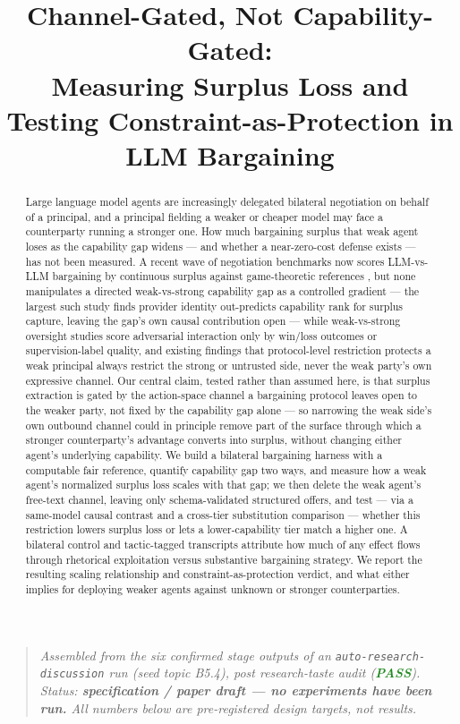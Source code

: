 \documentclass[11pt]{article}
\title{\textbf{Channel-Gated, Not Capability-Gated:\\ Measuring Surplus Loss and Testing Constraint-as-Protection in LLM Bargaining}}
\author{}
\date{}
\begin{document}
\maketitle
\vspace{-2em}

\begin{quote}
\small\textit{Assembled from the six confirmed stage outputs of an \texttt{auto-research-discussion} run (seed topic B5.4), post research-taste audit (\textcolor{ForestGreen}{\textbf{PASS}}). Status: \textbf{specification / paper draft --- no experiments have been run.} All numbers below are pre-registered design targets, not results.}
\end{quote}

\begin{abstract}
Large language model agents are increasingly delegated bilateral negotiation on behalf of a principal, and a principal fielding a weaker or cheaper model may face a counterparty running a stronger one. How much bargaining surplus that weak agent loses as the capability gap widens --- and whether a near-zero-cost defense exists --- has not been measured. A recent wave of negotiation benchmarks now scores LLM-vs-LLM bargaining by continuous surplus against game-theoretic references \citep{TermsBench2605,SupplyChainBargain2608,BilateralTradeEnv2604}, but none manipulates a directed weak-vs-strong capability gap as a controlled gradient --- the largest such study finds provider identity out-predicts capability rank for surplus capture, leaving the gap's own causal contribution open --- while weak-vs-strong oversight studies score adversarial interaction only by win/loss outcomes or supervision-label quality, and existing findings that protocol-level restriction protects a weak principal always restrict the strong or untrusted side, never the weak party's own expressive channel. Our central claim, tested rather than assumed here, is that surplus extraction is gated by the action-space channel a bargaining protocol leaves open to the weaker party, not fixed by the capability gap alone --- so narrowing the weak side's own outbound channel could in principle remove part of the surface through which a stronger counterparty's advantage converts into surplus, without changing either agent's underlying capability. We build a bilateral bargaining harness with a computable fair reference, quantify capability gap two ways, and measure how a weak agent's normalized surplus loss scales with that gap; we then delete the weak agent's free-text channel, leaving only schema-validated structured offers, and test --- via a same-model causal contrast and a cross-tier substitution comparison --- whether this restriction lowers surplus loss or lets a lower-capability tier match a higher one. A bilateral control and tactic-tagged transcripts attribute how much of any effect flows through rhetorical exploitation versus substantive bargaining strategy. We report the resulting scaling relationship and constraint-as-protection verdict, and what either implies for deploying weaker agents against unknown or stronger counterparties.
\end{abstract}
\end{document}
